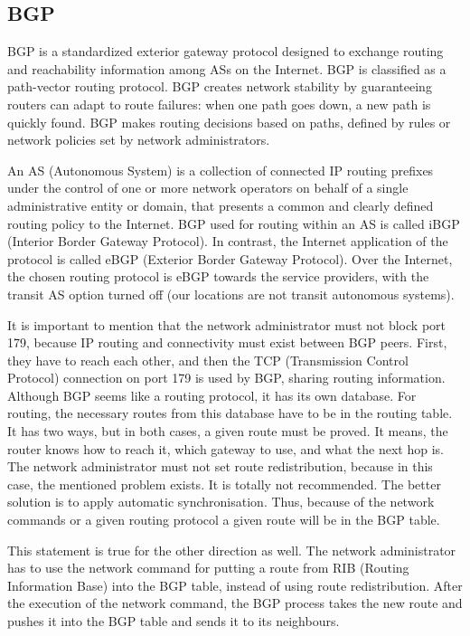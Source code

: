 \documentclass{article}
\begin{document}
\subsection{BGP}
BGP is a standardized exterior gateway protocol designed to exchange routing and reachability information among ASs on the Internet. BGP is classified as a path-vector routing protocol. BGP creates network stability by guaranteeing routers can adapt to route failures: when one path goes down, a new path is quickly found. BGP makes routing decisions based on paths, defined by rules or network policies set by network administrators.

An AS (Autonomous System) is a collection of connected IP routing prefixes under the control of one or more network operators on behalf of a single administrative entity or domain, that presents a common and clearly defined routing policy to the Internet. BGP used for routing within an AS is called iBGP (Interior Border Gateway Protocol). In contrast, the Internet application of the protocol is called eBGP (Exterior Border Gateway Protocol). Over the Internet, the chosen routing protocol is eBGP towards the service providers, with the transit AS option turned off (our locations are not transit autonomous systems). 

It is important to mention that the network administrator must not block port 179, because IP routing and connectivity must exist between BGP peers. First, they have to reach each other, and then the TCP (Transmission Control Protocol) connection on port 179 is used by BGP, sharing routing information. Although BGP seems like a routing protocol, it has its own database. For routing, the necessary routes from this database have to be in the routing table. It has two ways, but in both cases, a given route must be proved. It means, the router knows how to reach it, which gateway to use, and what the next hop is. The network administrator must not set route redistribution, because in this case, the mentioned problem exists. It is totally not recommended. The better solution is to apply automatic synchronisation. Thus, because of the network commands or a given routing protocol a given route will be in the BGP table.

This statement is true for the other direction as well. The network administrator has to use the network command for putting a route from RIB (Routing Information Base) into the BGP table, instead of using route redistribution. After the execution of the network command, the BGP process takes the new route and pushes it into the BGP table and sends it to its neighbours.
\end{document}
